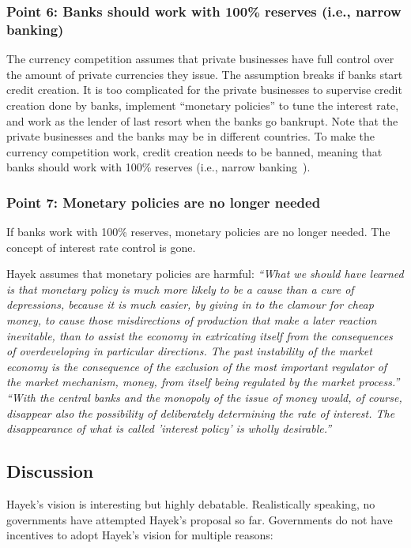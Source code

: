 \documentclass[dvipdfmx,a4paper]{article}
\begin{document}
\subsubsection*{Point 6: Banks should work with 100\% reserves (i.e., narrow banking)}

The currency competition assumes that private businesses have full control over the amount of private currencies they issue. The assumption breaks if banks start credit creation. It is too complicated for the private businesses to supervise credit creation done by banks, implement ``monetary policies'' to tune the interest rate, and work as the lender of last resort when the banks go bankrupt. Note that the private businesses and the banks may be in different countries. To make the currency competition work, credit creation needs to be banned, meaning that banks should work with 100\% reserves (i.e., narrow banking~\cite{pennacchi2012narrow,kay2009narrow}).

\subsubsection*{Point 7: Monetary policies are no longer needed}

If banks work with 100\% reserves, monetary policies are no longer needed. The concept of interest rate control is gone.

Hayek assumes that monetary policies are harmful: \textit{``What we should have learned is that monetary policy is much more likely to be a cause than a cure of depressions, because it is much easier, by giving in to the clamour for cheap money, to cause those misdirections of production that make a later reaction inevitable, than to assist the economy in extricating itself from the consequences of overdeveloping in particular directions. The past instability of the market economy is the consequence of the exclusion of the most important regulator of the market mechanism, money, from itself being regulated by the market process.''} \textit{``With the central banks and the monopoly of the issue of money would, of course, disappear also the possibility of deliberately determining the rate of interest. The disappearance of what is called 'interest policy' is wholly desirable.''}

\subsection{Discussion}

Hayek's vision is interesting but highly debatable. Realistically speaking, no governments have attempted Hayek's proposal so far. Governments do not have incentives to adopt Hayek's vision for multiple reasons:
\end{document}
